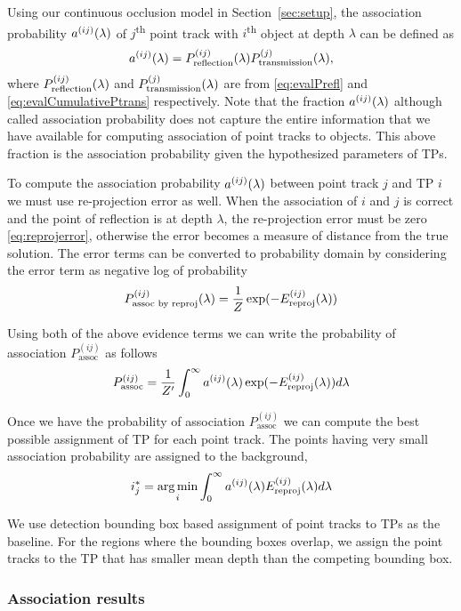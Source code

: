Using our continuous occlusion model in Section~\ref{sec:setup}, the association probability $a^{(ij)}(\lambda)$ of $j$\textsuperscript{th} point track with $i$\textsuperscript{th} object at depth $\lambda$ can be defined as
\begin{align}
  a^{(ij)}(\lambda) = P^{(ij)}_{\text{reflection}}(\lambda)P^{(j)}_{\text{transmission}}(\lambda),
\end{align}
where $P^{(ij)}_{\text{reflection}}(\lambda)$ and $P^{(j)}_{\text{transmission}}(\lambda)$ are from \ref{eq:evalPrefl} and \ref{eq:evalCumulativePtrans} respectively. Note that the fraction $a^{(ij)}(\lambda)$ although called association probability does not capture the entire information that we have available for computing association of point tracks to objects. This above fraction is the association probability given the hypothesized parameters of TPs. 

To compute the association probability $a^{(ij)}(\lambda)$ between point track $j$ and TP $i$ we must use re-projection error as well. When the association of $i$ and $j$ is correct and the point of reflection is at depth $\lambda$, the re-projection error must be zero \eqref{eq:reprojerror}, otherwise the error becomes a measure of distance from the true solution. The error terms can be converted to probability domain by considering the error term as negative log of probability
\begin{align}
  P^{(ij)}_{\text{assoc by reproj}}(\lambda) = \frac{1}{Z}\exp(-E^{(ij)}_{\text{reproj}}(\lambda))
\end{align}

Using both of the above evidence terms we can write the probability of association $P^{(ij)}_{\text{assoc}}$ as follows
\begin{align}
  P^{(ij)}_{\text{assoc}} = \frac{1}{Z'}\int_0^{\infty} a^{(ij)}(\lambda) \exp(-E^{(ij)}_{\text{reproj}}(\lambda))d\lambda
  \label{eq:prob-assoc}
\end{align}

Once we have the probability of association $P^{(ij)}_{\text{assoc}}$ we can compute the best possible assignment of TP for each point track. The points having very small association probability are assigned to the background,
\begin{align}
  i^*_{j} = \operatorname*{\arg\min}_{i} \int_0^\infty a^{(ij)}(\lambda) E^{(ij)}_{\text{reproj}}(\lambda) d\lambda
\end{align}

We use detection bounding box based assignment of point tracks to TPs as the baseline. For the regions where the bounding boxes overlap, we assign the point tracks to the TP that has smaller mean depth than the competing bounding box.

\subsubsection{Association results}

